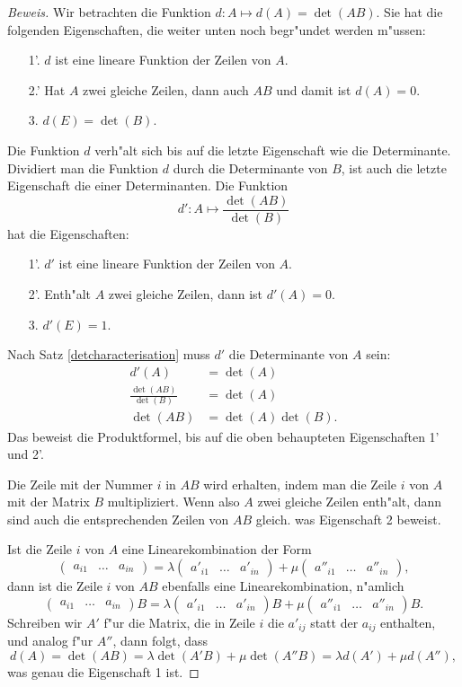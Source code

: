 \begin{proof}[Beweis]
Wir betrachten die Funktion $d\colon A\mapsto d(A) = \det(AB)$.
Sie hat die folgenden Eigenschaften, die weiter unten noch
begr"undet werden m"ussen:
\begin{enumerate}
\item[1'.] $d$ ist eine lineare Funktion der Zeilen von $A$.
\item[2.']
Hat $A$ zwei gleiche Zeilen, dann auch $AB$ und damit ist $d(A)=0$.
\item[3.]
$d(E)=\det(B)$.
\end{enumerate}
Die Funktion $d$ verh"alt sich bis auf die letzte Eigenschaft
wie die Determinante. Dividiert man die Funktion $d$ durch die Determinante
von $B$, ist auch die letzte Eigenschaft die einer Determinanten.
Die Funktion
\[
d':A\mapsto \frac{\det(AB)}{\det(B)}
\]
hat die Eigenschaften:
\begin{enumerate}
\item[1'.] $d'$ ist eine lineare Funktion der Zeilen von $A$.
\item[2'.] Enth"alt $A$ zwei gleiche Zeilen, dann ist $d'(A)=0$.
\item[3.] $d'(E)=1$.
\end{enumerate}
Nach Satz \ref{detcharacterisation} muss $d'$ die Determinante von $A$ sein:
\begin{align*}
d'(A)&=\det(A)\\
\frac{\det(AB)}{\det(B)}&=\det(A)\\
\det(AB)&=\det(A)\det(B).
\end{align*}
Das beweist die Produktformel, bis auf die oben behaupteten Eigenschaften
1' und 2'.

Die Zeile mit der Nummer $i$ in $AB$ wird erhalten,
indem man die Zeile $i$ von $A$
mit der Matrix $B$ multipliziert. Wenn also $A$ zwei gleiche
Zeilen enth"alt, dann sind auch die entsprechenden Zeilen von $AB$
gleich. was Eigenschaft 2 beweist.

Ist die Zeile $i$ von $A$ eine Linearekombination der Form
\[
\begin{pmatrix}
a_{i1}&\dots&a_{in}
\end{pmatrix}
=
\lambda
\begin{pmatrix}
a'_{i1} &\dots &a'_{in}
\end{pmatrix}
+
\mu
\begin{pmatrix}
a''_{i1} &\dots &a''_{in}
\end{pmatrix},
\]
dann ist die Zeile $i$ von $AB$ ebenfalls eine Linearekombination,
n"amlich
\[
\begin{pmatrix}
a_{i1}&\dots&a_{in}
\end{pmatrix}B
=
\lambda
\begin{pmatrix}
a'_{i1} &\dots &a'_{in}
\end{pmatrix}B
+
\mu
\begin{pmatrix}
a''_{i1} &\dots &a''_{in}
\end{pmatrix}B.
\]
Schreiben wir $A'$ f"ur die Matrix, die in Zeile $i$ die $a'_{ij}$
statt der $a_{ij}$ enthalten, und analog f"ur $A''$, dann folgt, dass
\[
d(A) = \det(AB)=\lambda \det(A'B)+\mu\det(A''B)=\lambda d(A') + \mu d(A''),
\]
was genau die Eigenschaft 1 ist.
\end{proof}

